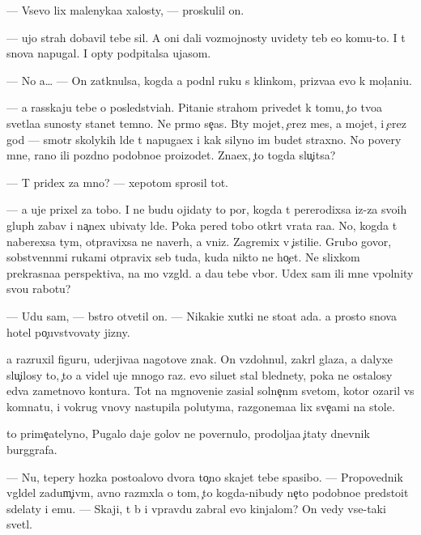 \documentclass[10pt]{book}
\begin{document}
— Vsevo lix malenyka{\y}a xalosty, — proskulil on.

— {\C}ujo{\y} strah dobavil tebe sil. A oni dali vozmojnosty uvidety teb{\ia} {\y}e{\x}o komu-to. I t{\yi} snova napugal. I op{\ia}ty podpitalsa ujasom.

— No {\y}a… — On zatknulsa, kogda {\y}a podn{\ia}l ruku s klinkom, priz{\yi}va{\y}a {\y}evo k mol{\c}ani{\y}u.

— {\Y}a rasskaju tebe o posledstvi{\y}ah. Pitani{\y}e strahom privedet k tomu, {\c}to tvo{\y}a svetla{\y}a su{\x}nosty stanet temno{\y}. Ne pr{\ia}mo se{\y}{\c}as. B{\yi}ty mojet, {\c}erez mes{\ia}{\q}, a mojet, i {\c}erez god — smotr{\ia} skolykih l{\iu}de{\y} t{\yi} napuga{\y}ex i kak silyno im budet straxno. No povery mne, rano ili pozdno podobno{\y}e pro{\y}izo{\y}det. Zna{\y}ex, {\c}to togda slu{\c}itsa?

— T{\yi} pridex za mno{\y}? — xepotom sprosil tot.

— {\Y}a uje prixel za tobo{\y}. I ne budu ojidaty to{\y} por{\yi}, kogda t{\yi} pererodixsa iz-za svo{\y}ih glup{\yi}h zabav i na{\c}nex ubivaty l{\iu}de{\y}. Poka pered tobo{\y} otkr{\yi}t{\yi} vrata ra{\y}a. No, kogda t{\yi} naberexsa tym{\yi}, otpravixsa ne naverh, a vniz. Zagremix v {\c}istili{\x}e. Grubo govor{\ia}, sobstvenn{\yi}mi rukami otpravix seb{\ia} tuda, kuda nikto ne ho{\c}et. Ne slixkom prekrasna{\y}a perspektiva, na mo{\y} vzgl{\ia}d. {\Y}a da{\y}u tebe v{\yi}bor. U{\y}dex sam ili mne v{\yi}polnity svo{\y}u rabotu?

— U{\y}du sam, — b{\yi}stro otvetil on. — Nikaki{\y}e xutki ne sto{\y}at ada. {\Y}a prosto snova hotel po{\c}uvstvovaty jizny.

{\Y}a razruxil figuru, uderjiva{\y}a nagotove znak. On vzdohnul, zakr{\yi}l glaza, a dalyxe slu{\c}ilosy to, {\c}to {\y}a videl uje mnogo raz. {\Y}evo siluet stal blednety, poka ne ostalosy {\y}edva zametnovo kontura. Tot na mgnoveni{\y}e zasi{\y}al solne{\c}n{\yi}m svetom, kotor{\yi}{\y} ozaril vs{\iu} komnatu, i vokrug vnovy nastupila polutyma, razgon{\ia}{\y}ema{\y}a lix sve{\c}ami na stole.

{\C}to prime{\c}atelyno, Pugalo daje golov{\yi} ne povernulo, prodolja{\y}a {\c}itaty dnevnik burggrafa.

— Nu, tepery hoz{\ia}{\y}ka posto{\y}alovo dvora to{\c}no skajet tebe spasibo. — Propovednik v{\yi}gl{\ia}del zadum{\c}iv{\yi}m, {\y}avno razm{\yi}xl{\ia}{\y}a o tom, {\c}to kogda-nibudy ne{\c}to podobno{\y}e predsto{\y}it sdelaty i {\y}emu. — Skaji, t{\yi} b{\yi} i vpravdu zabral {\y}evo kinjalom? On vedy vse-taki svetl{\yi}{\y}.
\end{document}
